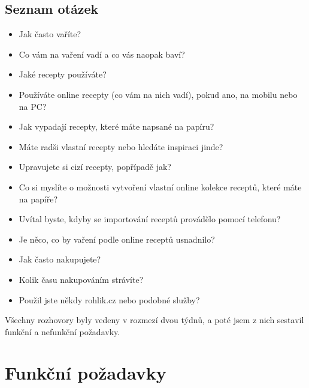 \subsection{Seznam otázek}
\begin{itemize}
    \item Jak často vaříte?
    \item Co vám na vaření vadí a co vás naopak baví?
    \item Jaké recepty používáte?
    \item Používáte online recepty (co vám na nich vadí), pokud ano, na mobilu nebo na PC?
    \item Jak vypadají recepty, které máte napsané na papíru?
    \item Máte radši vlastní recepty nebo hledáte inspiraci jinde?
    \item Upravujete si cizí recepty, popřípadě jak?
    \item Co si myslíte o možnosti vytvoření vlastní online kolekce receptů, které máte na papíře?
    \item Uvítal byste, kdyby se importování receptů provádělo pomocí telefonu?
    \item Je něco, co by vaření podle online receptů usnadnilo?
    \item Jak často nakupujete?
    \item Kolik času nakupováním strávíte?
    \item Použil jste někdy rohlik.cz nebo podobné služby?
\end{itemize}

Všechny rozhovory byly vedeny v rozmezí dvou týdnů, a poté jsem z nich sestavil funkční a nefunkční požadavky.

\section{Funkční požadavky}


